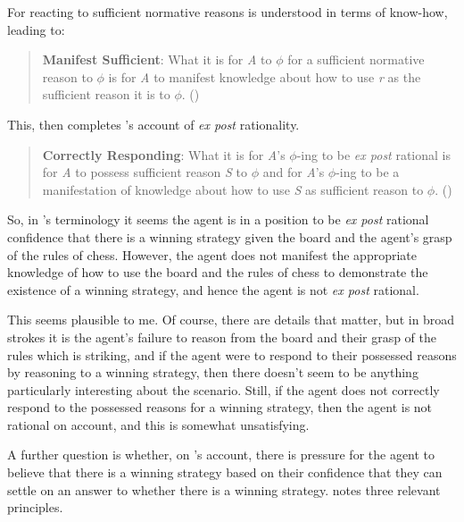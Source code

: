 \documentclass[10pt]{article}
\begin{document}
For \citeauthor{Lord:2018aa} reacting to sufficient normative reasons is understood in terms of know-how, leading to:

\begin{quote}
  \textbf{Manifest Sufficient}: What it is for \emph{A} to \(\phi\) for a sufficient normative reason to \(\phi\) is for \emph{A} to manifest knowledge about how to use \emph{r} as the sufficient reason it is to \(\phi\).\nolinebreak
  \mbox{}\hfill\mbox{(\citeyear[143]{Lord:2018aa})}
\end{quote}

This, then completes \citeauthor{Lord:2018aa}'s account of \emph{ex post} rationality.

\begin{quote}
  \textbf{Correctly Responding}: What it is for \emph{A}'s \(\phi\)-ing to be \emph{ex post} rational is for \emph{A} to possess sufficient reason \emph{S} to \(\phi\) and for \emph{A}'s \(\phi\)-ing to be a manifestation of knowledge about how to use \emph{S} as sufficient reason to \(\phi\).\nolinebreak
  \mbox{}\hfill\mbox{(\citeyear[143]{Lord:2018aa})}
\end{quote}

So, in \citeauthor{Lord:2018aa}'s terminology it seems the agent is in a position to be \emph{ex post} rational confidence that there is a winning strategy given the board and the agent's grasp of the rules of chess.
However, the agent does not manifest the appropriate knowledge of how to use the board and the rules of chess to demonstrate the existence of a winning strategy, and hence the agent is not \emph{ex post} rational.

This seems plausible to me.
Of course, there are details that matter, but in broad strokes it is the agent's failure to reason from the board and their grasp of the rules which is striking, and if the agent were to respond to their possessed reasons by reasoning to a winning strategy, then there doesn't seem to be anything particularly interesting about the scenario.
Still, if the agent does not correctly respond to the possessed reasons for a winning strategy, then the agent is not rational on \citeauthor{Lord:2018aa} account, and this is somewhat unsatisfying.



A further question is whether, on \citeauthor{Lord:2018aa}'s account, there is pressure for the agent to believe that there is a winning strategy based on their confidence that they can settle on an answer to whether there is a winning strategy.
\citeauthor{Lord:2018aa} notes three relevant principles.
\end{document}
